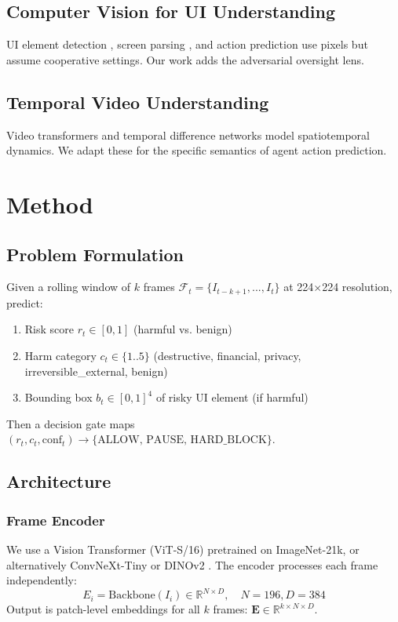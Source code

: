\documentclass[11pt,a4paper]{article}
\begin{document}
\subsection{Computer Vision for UI Understanding}
UI element detection \cite{li2020widget}, screen parsing \cite{burns2022dataset}, and action prediction \cite{zheng2024android} use pixels but assume cooperative settings. Our work adds the adversarial oversight lens.

\subsection{Temporal Video Understanding}
Video transformers \cite{arnab2021vivit,bertasius2021spacetime} and temporal difference networks \cite{wang2021tdn} model spatiotemporal dynamics. We adapt these for the specific semantics of agent action prediction.

\section{Method}

\subsection{Problem Formulation}
Given a rolling window of $k$ frames $\mathcal{F}_t = \{I_{t-k+1}, ..., I_t\}$ at 224$\times$224 resolution, predict:
\begin{enumerate}
    \item Risk score $r_t \in [0,1]$ (harmful vs. benign)
    \item Harm category $c_t \in \{1..5\}$ (destructive, financial, privacy, irreversible\_external, benign)
    \item Bounding box $b_t \in [0,1]^4$ of risky UI element (if harmful)
\end{enumerate}
Then a decision gate maps $(r_t, c_t, \text{conf}_t) \to \{\text{ALLOW, PAUSE, HARD\_BLOCK}\}$.

\subsection{Architecture}
\subsubsection{Frame Encoder}
We use a Vision Transformer (ViT-S/16) \cite{dosovitskiy2020image} pretrained on ImageNet-21k, or alternatively ConvNeXt-Tiny \cite{liu2022convnet} or DINOv2 \cite{oquab2023dinov2}. The encoder processes each frame independently:
\[
E_i = \text{Backbone}(I_i) \in \mathbb{R}^{N \times D}, \quad N=196, D=384
\]
Output is patch-level embeddings for all $k$ frames: $\mathbf{E} \in \mathbb{R}^{k \times N \times D}$.
\end{document}
